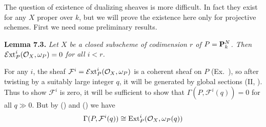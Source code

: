{\smallskip
The question of existence of dualizing sheaves is more difficult. In fact they exist for any $X$ proper over $k$, but we will prove the existence here only for projective schemes. First we need some preliminary results.

\medskip
\noindent\hypertarget{result-III-7.3}{}\textbf{Lemma 7.3.} \emph{Let $X$ be a closed subscheme of codimension $r$ of $P=\mathbf{P}_k^N$. Then $\operatorname{\mathcal E xt}_P^i(\mathcal O_X,\omega_P)=0$ for all $i<r$.}

\Proof For any $i$, the sheaf $\mathcal F^i=\operatorname{\mathcal E xt}_P^i(\mathcal O_X,\omega_P)$ is a coherent sheaf on $P$ (Ex.~), so after twisting by a suitably large integer $q$, it will be generated by global sections (II, ). Thus to show $\mathcal F^i$ is zero, it will be sufficient to show that $\Gamma(P,\mathcal F^i(q))=0$ for all $q\gg0$. But by () and () we have
\[
\Gamma(P,\mathcal F^i(q))\cong\operatorname{Ext}_P^i(\mathcal O_X,\omega_P(q))
\]
}
